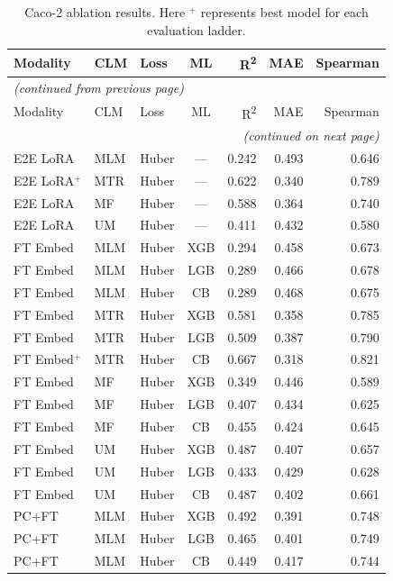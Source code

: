 \documentclass[9pt,a4paper]{article}
\begin{document}
\begin{scriptsize}
\begin{longtable}{lllcrrr}
\caption{Caco-2 ablation results. Here $^{+}$ represents best model for each evaluation ladder.}
\label{tab:s7_caco2} \\
\toprule
Modality & CLM & Loss & ML & R\textsuperscript{2} & MAE & Spearman \\
\midrule
\endfirsthead
\multicolumn{7}{l}{\footnotesize\textit{(continued from previous page)}} \\
\toprule
Modality & CLM & Loss & ML & R\textsuperscript{2} & MAE & Spearman \\
\midrule
\endhead
\midrule
\multicolumn{7}{r}{\footnotesize\textit{(continued on next page)}} \\
\endfoot
\bottomrule
\endlastfoot
E2E LoRA & MLM & Huber & --- & 0.242 & 0.493 & 0.646 \\
E2E LoRA$^+$ & MTR & Huber & --- & 0.622 & 0.340 & 0.789 \\
E2E LoRA & MF  & Huber & --- & 0.588 & 0.364 & 0.740 \\
E2E LoRA & UM  & Huber & --- & 0.411 & 0.432 & 0.580 \\
\midrule
FT Embed & MLM & Huber & XGB & 0.294 & 0.458 & 0.673 \\
FT Embed & MLM & Huber & LGB & 0.289 & 0.466 & 0.678 \\
FT Embed & MLM & Huber & CB  & 0.289 & 0.468 & 0.675 \\
FT Embed & MTR & Huber & XGB & 0.581 & 0.358 & 0.785 \\
FT Embed & MTR & Huber & LGB & 0.509 & 0.387 & 0.790 \\
FT Embed$^+$ & MTR & Huber & CB & 0.667 & 0.318 & 0.821 \\
FT Embed & MF  & Huber & XGB & 0.349 & 0.446 & 0.589 \\
FT Embed & MF  & Huber & LGB & 0.407 & 0.434 & 0.625 \\
FT Embed & MF  & Huber & CB  & 0.455 & 0.424 & 0.645 \\
FT Embed & UM  & Huber & XGB & 0.487 & 0.407 & 0.657 \\
FT Embed & UM  & Huber & LGB & 0.433 & 0.429 & 0.628 \\
FT Embed & UM  & Huber & CB  & 0.487 & 0.402 & 0.661 \\
\midrule
PC+FT & MLM & Huber & XGB & 0.492 & 0.391 & 0.748 \\
PC+FT & MLM & Huber & LGB & 0.465 & 0.401 & 0.749 \\
PC+FT & MLM & Huber & CB  & 0.449 & 0.417 & 0.744 \\

\end{longtable}
\end{scriptsize}
\end{document}
